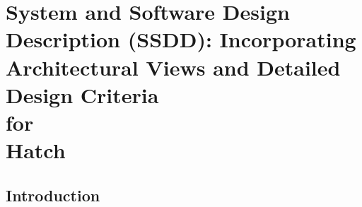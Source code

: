 \documentclass[12pt, oneside, letterpaper]{report}
\begin{document}
\part{System and Software Design Description (SSDD): Incorporating
     Architectural Views and Detailed Design Criteria \\ for \\ Hatch}
\tableofcontents                                %
\listoffigures
\listoftables
\chapter{Introduction}

\end{document}
